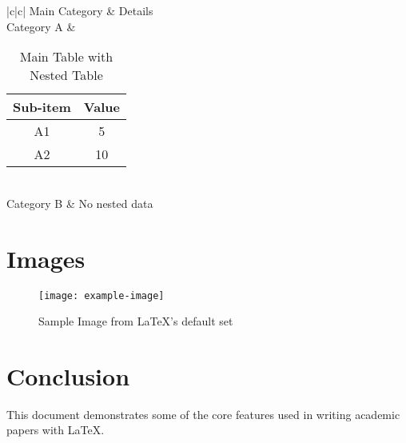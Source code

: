 \documentclass[12pt]{article}
\begin{document}
	\begin{table}[H]
		\centering
		\caption{Main Table with Nested Table}
		\begin{tabular}{|c|c|}
			\hline
			Main Category & Details \\
			\hline
			Category A &
			\begin{minipage}{0.5\textwidth}
				\centering
				\begin{tabular}{|c|c|}
					\hline
					Sub-item & Value \\
					\hline
					A1 & 5 \\
					A2 & 10 \\
					\hline
				\end{tabular}
			\end{minipage} \\
			\hline
			Category B & No nested data \\
			\hline
		\end{tabular}
	\end{table}
	
	\section{Images}
	
	\begin{figure}[H]
		\centering
		\texttt{[image: example-image]} %
		\caption{Sample Image from LaTeX's default set}
	\end{figure}
	
	\section{Conclusion}
	
	This document demonstrates some of the core features used in writing academic papers with LaTeX.
	
\end{document}
